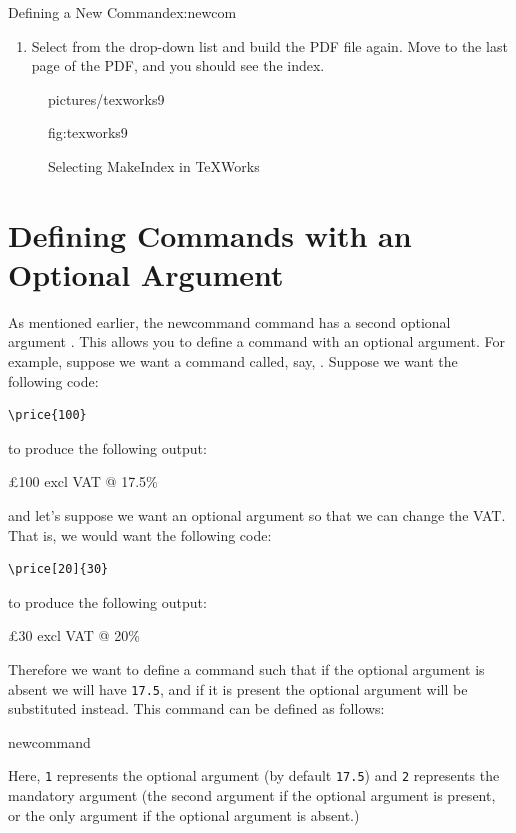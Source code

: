 \begin{exercise}{Defining a New Command}{ex:newcom}
\begin{enumerate}
  \item Select  from the drop-down list and build the
    PDF file again. Move to the last page of the PDF, and you should
    see the index.
\end{enumerate}

\begin{figure}[htbp]
\figconts
  {pictures/texworks9}
  {%
    \caption{Selecting MakeIndex in TeXWorks}
  }%
  {fig:texworks9}
\end{figure}

\end{exercise}


\section{Defining Commands with an Optional Argument}
\label{sec:newcomopt}

As mentioned earlier, the \gls{newcommand} command has a second
optional argument .  This allows you to define a
command with an optional argument.  For example, suppose we want a command called,
say, .  Suppose we want the following code:
\begin{codeS}
\begin{verbatim}
\price{100}
\end{verbatim}
\end{codeS}%
to produce the following output:
\begin{resultS}
\pounds100 excl VAT @ 17.5\%\relax
\end{resultS}%
and let's suppose we want an optional argument
so that we can change the VAT.  That is, we
would want the following code:
\begin{codeS}
\begin{verbatim}
\price[20]{30}
\end{verbatim}
\end{codeS}%
to produce the following output:
\begin{resultS}
\pounds30 excl VAT @ 20\%
\end{resultS}%
Therefore we want to define a command
such that if the optional argument is absent 
we will have \texttt{17.5}, and if it is present
the optional argument will be substituted instead.
This command can be defined as follows:
\begin{codeS}
\gls{newcommand}
\end{codeS}%
Here, \texttt{1} represents the optional argument (by default
\texttt{17.5}) and \texttt{2} represents the mandatory argument (the
second argument if the optional argument is present, or the only
argument if the optional argument is absent.)

